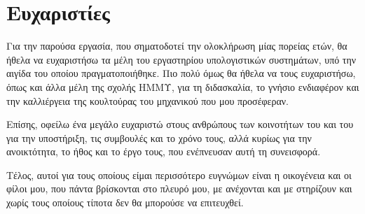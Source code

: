 \chapter*{Ευχαριστίες}
Για την παρούσα εργασία, που σηματοδοτεί την ολοκλήρωση μίας πορείας ετών, θα
ήθελα να ευχαριστήσω τα μέλη του εργαστηρίου υπολογιστικών συστημάτων, υπό την
αιγίδα του οποίου πραγματοποιήθηκε. Πιο πολύ όμως θα ήθελα να τους ευχαριστήσω,
όπως και άλλα μέλη της σχολής ΗΜΜΥ, για τη διδασκαλία, το γνήσιο ενδιαφέρον και
την καλλιέργεια της κουλτούρας του μηχανικού που μου προσέφεραν.

Επίσης, οφείλω ένα μεγάλο ευχαριστώ στους ανθρώπους των κοινοτήτων του \osv{}
και του \viofs{} για την υποστήριξη, τις συμβουλές και το χρόνο τους, αλλά
κυρίως για την ανοικτότητα, το ήθος και το έργο τους, που ενέπνευσαν αυτή τη
συνεισφορά.

Τέλος, αυτοί για τους οποίους είμαι περισσότερο ευγνώμων είναι η οικογένεια και
οι φίλοι μου, που πάντα βρίσκονται στο πλευρό μου, με ανέχονται και με στηρίζουν
και χωρίς τους οποίους τίποτα δεν θα μπορούσε να επιτευχθεί.
